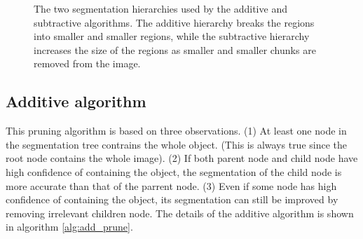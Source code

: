 \documentclass[10pt,twocolumn,letterpaper]{article}
\begin{document}
\begin{figure}
\centering
{}
\caption{The two segmentation hierarchies used by the additive 
and subtractive  algorithms.  The additive hierarchy breaks the
regions into smaller and smaller regions, while the subtractive hierarchy increases
the size of the regions as smaller and smaller chunks are removed from the image.}
\label{fig:tree}
\end{figure}

\subsection{Additive algorithm}
\label{ssec:additive}

This pruning algorithm is based on three observations. (1) At least
one node in the segmentation tree contrains the whole object. (This
is always true since the root node contains the whole image). (2) If
both parent node and child node have high confidence of containing
the object, the segmentation of the child node is more accurate than
that of the parrent node. (3) Even if some node has high confidence
of containing the object, its segmentation can still be improved by
removing irrelevant children node. The details of the additive
algorithm is shown in algorithm \ref{alg:add_prune}.
\end{document}
